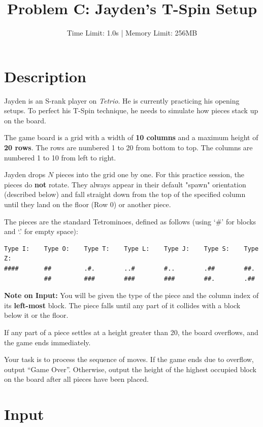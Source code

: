 \documentclass[11pt, letterpaper]{article}
\title{\textbf{Problem C: Jayden's T-Spin Setup}}
\author{Time Limit: 1.0s | Memory Limit: 256MB}
\date{}
\begin{document}
\maketitle

\section*{Description}

Jayden is an S-rank player on \textit{Tetrio}. He is currently practicing his opening setups. To perfect his T-Spin technique, he needs to simulate how pieces stack up on the board.

The game board is a grid with a width of \textbf{10 columns} and a maximum height of \textbf{20 rows}. The rows are numbered 1 to 20 from bottom to top. The columns are numbered 1 to 10 from left to right.

Jayden drops $N$ pieces into the grid one by one. For this practice session, the pieces do \textbf{not} rotate. They always appear in their default "spawn" orientation (described below) and fall straight down from the top of the specified column until they land on the floor (Row 0) or another piece.

The pieces are the standard Tetrominoes, defined as follows (using `\#' for blocks and `.' for empty space):

\begin{verbatim}
Type I:    Type O:    Type T:    Type L:    Type J:    Type S:    Type Z:
####       ##         .#.        ..#        #..        .##        ##.
           ##         ###        ###        ###        ##.        .##
\end{verbatim}

\textbf{Note on Input:}
You will be given the type of the piece and the column index of its \textbf{left-most} block. The piece falls until any part of it collides with a block below it or the floor.

If any part of a piece settles at a height greater than 20, the board overflows, and the game ends immediately.

Your task is to process the sequence of moves. If the game ends due to overflow, output ``Game Over''. Otherwise, output the height of the highest occupied block on the board after all pieces have been placed.

\section*{Input}
\end{document}
